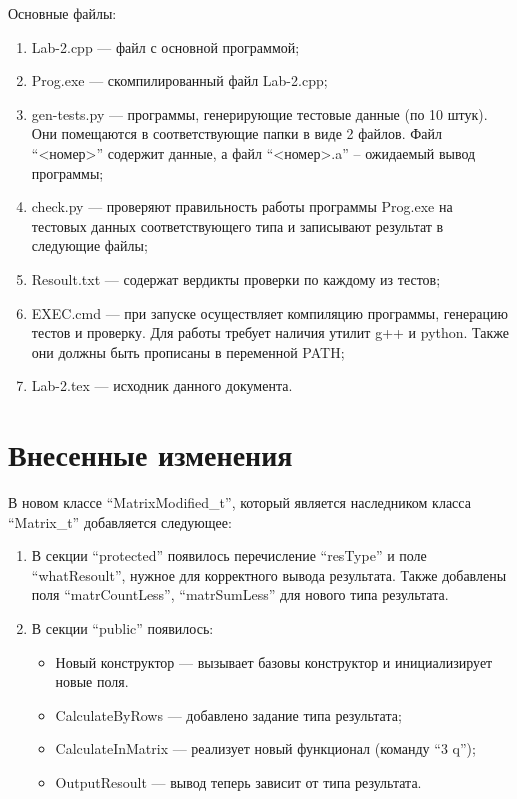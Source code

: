 \documentclass[a4paper,12pt]{article}
\theoremstyle{plain}
\theoremstyle{remark}
\theoremstyle{definition}
\begin{document}
	Основные файлы:
	\begin{enumerate}
		\item Lab-2.cpp --- файл с основной программой;
		
		\item Prog.exe --- скомпилированный файл Lab-2.cpp;
		
		\item gen-tests.py --- программы, генерирующие тестовые данные (по 10 штук). Они помещаются в соответствующие папки в виде 2 файлов. Файл ``<номер>'' содержит данные, а файл ``<номер>.a'' -- ожидаемый вывод программы;
		
		\item check.py --- проверяют правильность работы программы Prog.exe на тестовых данных соответствующего типа и записывают результат в следующие файлы;
		
		\item Resoult.txt --- содержат вердикты проверки по каждому из тестов;
		
		\item EXEC.cmd --- при запуске осуществляет компиляцию программы, генерацию тестов и проверку. Для работы требует наличия утилит g++ и python. Также они должны быть прописаны в переменной PATH;
		
		\item Lab-2.tex --- исходник данного документа.
	\end{enumerate}
	\section{Внесенные изменения}
	
	В новом классе ``MatrixModified\_t'', который является наследником класса ``Matrix\_t'' добавляется следующее:
	\begin{enumerate}
		\item В секции ``protected'' появилось перечисление ``resType'' и поле ``whatResoult'', нужное для корректного вывода результата. Также добавлены поля ``matrCountLess'', ``matrSumLess'' для нового типа результата.
		
		\item В секции ``public'' появилось:
		\begin{itemize}
			\item Новый конструктор --- вызывает базовы конструктор и инициализирует новые поля.
			
			\item CalculateByRows --- добавлено задание типа результата;
			
			\item CalculateInMatrix --- реализует новый функционал (команду ``3 q'');
			
			\item OutputResoult --- вывод теперь зависит от типа результата.
		\end{itemize}
	\end{enumerate}
	
	
	
\end{document}
